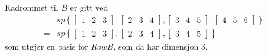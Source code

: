 \documentclass[11pt, a4paper, norsk]{NTNUoving}
\begin{document}
\begin{oppgave}
\begin{punkt}
        Radrommet til $B$ er gitt ved 
        \begin{align*}
            &sp\left\{\begin{bmatrix} 1 & 2 & 3\end{bmatrix},\begin{bmatrix} 2&3&4\end{bmatrix},\begin{bmatrix} 3&4&5\end{bmatrix}, \begin{bmatrix}4&5&6\end{bmatrix}\right\}\\=&sp\left\{\begin{bmatrix} 1 & 2 & 3\end{bmatrix},\begin{bmatrix} 2&3&4\end{bmatrix},\begin{bmatrix} 3&4&5\end{bmatrix}\right\}
        \end{align*}
        som utgjør en basis for $Row B$, som da har dimensjon 3.
    \end{punkt}
    

\end{oppgave}
\end{document}
